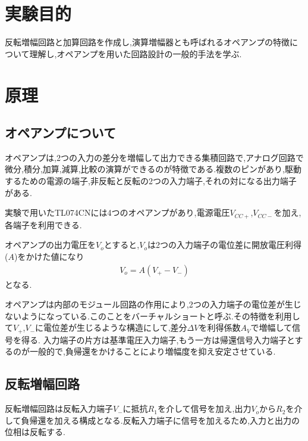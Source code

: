 \documentclass[a4j,10pt,dvipdfmx]{jarticle}
\author{学籍番号2120029, 氏名 政野玄空}
\date{2023年6月22日}
\begin{document}
\section{実験目的}
反転増幅回路と加算回路を作成し,演算増幅器とも呼ばれるオペアンプの特徴について理解し,オペアンプを用いた回路設計の一般的手法を学ぶ.
\section{原理}

\subsection{オペアンプについて}
オペアンプは,2つの入力の差分を増幅して出力できる集積回路で,アナログ回路で微分,積分,加算,減算,比較の演算ができるのが特徴である.複数のピンがあり,駆動するための電源の端子,非反転と反転の2つの入力端子,それの対になる出力端子がある.

実験で用いたTL074CNには4つのオペアンプがあり,電源電圧$V_{CC+}$,$V_{CC-}$を加え,各端子を利用できる.

オペアンプの出力電圧を$V_o$とすると,$V_o$は2つの入力端子の電位差に開放電圧利得($A$)をかけた値になり
\begin{eqnarray}
  \label{V_o}
  V_o = A(V_{+}-V_{-})
\end{eqnarray}
となる.

オペアンプは内部のモジュール回路の作用により,2つの入力端子の電位差が生じないようになっている.このことをバーチャルショートと呼ぶ.その特徴を利用して$V_{+}$,$V_{-}$に電位差が生じるような構造にして,差分$\Delta V$を利得係数$A_V$で増幅して信号を得る.
入力端子の片方は基準電圧入力端子,もう一方は帰還信号入力端子とするのが一般的で,負帰還をかけることにより増幅度を抑え安定させている.

\subsection{反転増幅回路}
反転増幅回路は反転入力端子$V_-$に抵抗$R_1$を介して信号を加え,出力$V_o$から$R_2$を介して負帰還を加える構成となる.反転入力端子に信号を加えるため,入力と出力の位相は反転する.
\end{document}
